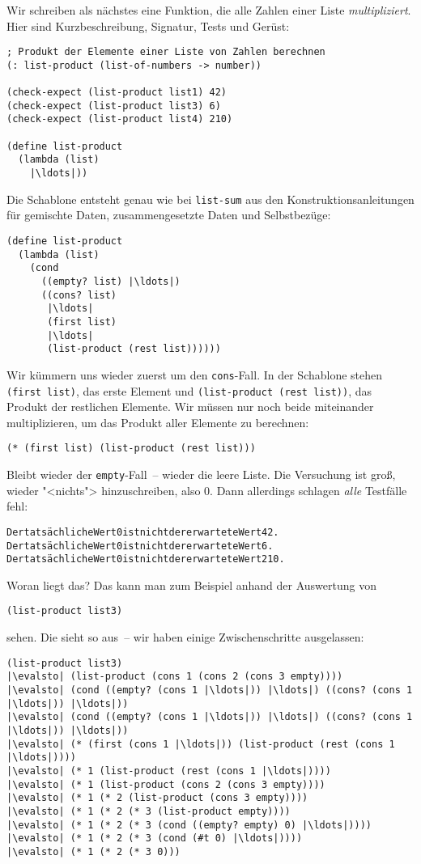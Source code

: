 Wir schreiben als nächstes eine Funktion, die alle Zahlen einer Liste
\emph{multipliziert}.   Hier sind Kurzbeschreibung, Signatur, Tests
und Gerüst:
%
\begin{lstlisting}
; Produkt der Elemente einer Liste von Zahlen berechnen
(: list-product (list-of-numbers -> number))

(check-expect (list-product list1) 42)
(check-expect (list-product list3) 6)
(check-expect (list-product list4) 210)

(define list-product
  (lambda (list)
    |\ldots|))
\end{lstlisting}
%
Die Schablone entsteht genau wie bei \lstinline{list-sum} aus den
Konstruktionsanleitungen für gemischte Daten, zusammengesetzte Daten
und Selbstbezüge:
%
\begin{lstlisting}
(define list-product
  (lambda (list)
    (cond
      ((empty? list) |\ldots|)
      ((cons? list)
       |\ldots|
       (first list) 
       |\ldots|
       (list-product (rest list))))))
\end{lstlisting}
%
Wir kümmern uns wieder zuerst um den
\lstinline{cons}-Fall. In der Schablone stehen \lstinline{(first list)}, das erste
Element und \lstinline{(list-product (rest list))}, das Produkt der
restlichen Elemente.  Wir müssen nur noch beide miteinander
multiplizieren, um das Produkt aller Elemente zu berechnen:
%
\begin{lstlisting}
(* (first list) (list-product (rest list)))
\end{lstlisting}
%
Bleibt wieder der \lstinline{empty}-Fall~-- wieder die leere Liste.
Die Versuchung ist groß, wieder "<nichts"> hinzuschreiben, also 0.
Dann allerdings schlagen \emph{alle} Testfälle fehl:
\begin{alltt}
Der tatsächliche Wert 0 ist nicht der erwartete Wert 42.
Der tatsächliche Wert 0 ist nicht der erwartete Wert 6.
Der tatsächliche Wert 0 ist nicht der erwartete Wert 210.
\end{alltt}
%
Woran liegt das?  Das kann man zum Beispiel anhand der Auswertung von
%
\begin{lstlisting}
(list-product list3)
\end{lstlisting}
%
sehen.  Die sieht so aus~-- wir haben
einige Zwischenschritte ausgelassen:
%
\begin{lstlisting}
(list-product list3)
|\evalsto| (list-product (cons 1 (cons 2 (cons 3 empty))))
|\evalsto| (cond ((empty? (cons 1 |\ldots|)) |\ldots|) ((cons? (cons 1 |\ldots|)) |\ldots|))
|\evalsto| (cond ((empty? (cons 1 |\ldots|)) |\ldots|) ((cons? (cons 1 |\ldots|)) |\ldots|))
|\evalsto| (* (first (cons 1 |\ldots|)) (list-product (rest (cons 1 |\ldots|))))
|\evalsto| (* 1 (list-product (rest (cons 1 |\ldots|))))
|\evalsto| (* 1 (list-product (cons 2 (cons 3 empty))))
|\evalsto| (* 1 (* 2 (list-product (cons 3 empty))))
|\evalsto| (* 1 (* 2 (* 3 (list-product empty))))
|\evalsto| (* 1 (* 2 (* 3 (cond ((empty? empty) 0) |\ldots|))))
|\evalsto| (* 1 (* 2 (* 3 (cond (#t 0) |\ldots|))))
|\evalsto| (* 1 (* 2 (* 3 0)))
\end{lstlisting}
